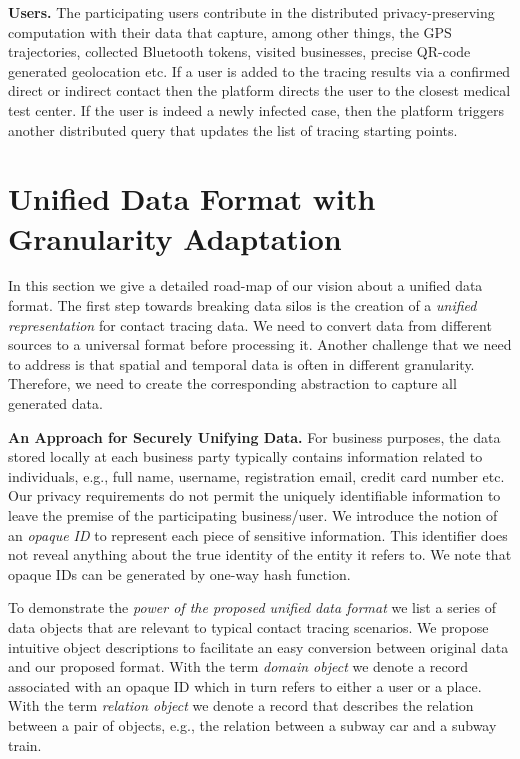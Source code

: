 \documentclass[11pt]{article}  %
\begin{document}
\textbf{Users. }The participating users contribute in the distributed privacy-preserving computation with their data that capture, among other things, the GPS trajectories, collected Bluetooth tokens, visited businesses, precise QR-code generated geolocation etc.
If a user is added to the tracing results via a confirmed direct or indirect contact then the platform directs the user to the closest medical test center. 
If the user is indeed a newly infected case, then the platform triggers another distributed query that updates the list of tracing starting points.






\section{Unified Data Format with Granularity Adaptation}
\label{dataformat}

In this section we give a detailed road-map of our vision about a unified data format. 
The first step towards breaking data silos is the creation of a \emph{unified representation} for contact tracing data. We need to convert data from different sources to a universal format before processing it. 
Another challenge that we need to address is that spatial and temporal data is often in different granularity. 
Therefore, we need to create the corresponding abstraction to capture all generated data.

\textbf{An Approach for Securely Unifying Data.} For business purposes, the data stored locally at each business party typically contains information related to individuals, e.g., full name, username, registration email, credit card number etc.
Our privacy requirements do not permit the uniquely identifiable information to leave the premise of the participating business/user. 
 We introduce the notion of an \emph{opaque ID} to represent each piece of  sensitive information. 
This identifier does not reveal anything about the true identity of the entity it refers to. 
We note that opaque IDs can be generated by one-way hash function.


To demonstrate the \emph{power of the proposed unified data format} we list a series of data objects that are relevant to typical contact tracing scenarios. 
We propose intuitive object descriptions to facilitate an easy conversion between original data and our proposed format. 
With the term \emph{domain object} we denote a record associated with an opaque ID which in turn refers to either a user or a place.  
With the term \emph{relation object} we denote a record that describes the relation between a pair of objects, e.g., the relation between a subway car and a subway train.
\end{document}
